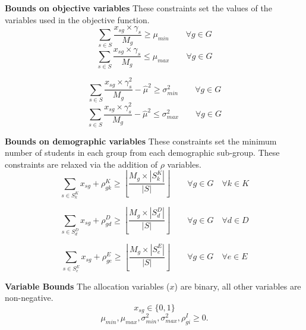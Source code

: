 \documentclass[12pt]{ORSNZ}
\begin{document}
\begin{description}
\textbf{Bounds on objective variables} These constraints set the values of the variables used in the objective function.
\begin{equation} \label{minu}
\sum_{s \in S} \frac{x_{sg}\times \gamma_s}{M_g} \geq \mu_{min} \qquad \mbox{$\forall g \in G$}
\end{equation}
\begin{equation} \label{maxu}
\sum_{s \in S} \frac{x_{sg}\times \gamma_s}{M_g} \leq \mu_{max} \qquad \mbox{$\forall g \in G$}
\end{equation}

\begin{equation} \label{minv}
\sum_{s \in S} \frac{x_{sg}\times \gamma_s^2}{M_g}  - \hat{\mu}^2 \geq \sigma^2_{min} \qquad\mbox{$\forall g \in G$}
\end{equation}
\begin{equation} \label{maxv}
\sum_{s \in S} \frac{x_{sg}\times \gamma_s^2}{M_g}  - \hat{\mu}^2 \leq \sigma^2_{max} \qquad\mbox{$\forall g \in G$}
\end{equation}


\textbf{Bounds on demographic variables} These constraints set the minimum number of students in each group from each demographic sub-group. These constraints are relaxed via the addition of $\rho$ variables.
\begin{equation} \label{con3}
\sum_{s \in S^K_k} x_{sg} + \rho^K_{gk} \geq \left\lfloor\frac{M_g\times |S^K_k|}{|S|}\right\rfloor \qquad \mbox{$\forall g \in G \quad \forall k \in K$}
\end{equation}

\begin{equation} \label{con4}
\sum_{s \in S^D_d} x_{sg} + \rho^D_{gd}  \geq \left\lfloor\frac{M_g\times |S^D_d|}{|S|}\right\rfloor \qquad \mbox{$\forall g \in G \quad \forall d \in D$}
\end{equation}

\begin{equation} \label{con5}
\sum_{s \in S^E_e} x_{sg} + \rho^E_{ge}  \geq \left\lfloor\frac{M_g\times |S^E_e|}{|S|}\right\rfloor \qquad \mbox{$\forall g \in G \quad \forall e \in E$}
\end{equation}

\textbf{Variable Bounds} The allocation variables ($x$) are binary, all other variables are non-negative.
\[x_{sg} \in \{0, 1\}\]
\[\mu_{min}, \mu_{max}, \sigma^2_{min}, \sigma^2_{max}, \rho^I_{gi}  \ge 0.\]

\end{description}
\end{document}
